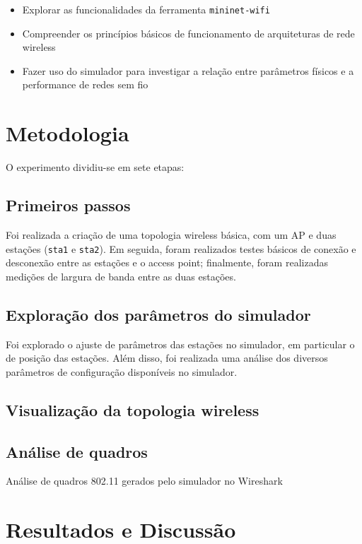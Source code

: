 \documentclass{article}
\begin{document}
\begin{itemize}
    \item Explorar as funcionalidades da ferramenta \texttt{mininet-wifi}
    \item Compreender os princípios básicos de funcionamento de arquiteturas
          de rede wireless
    \item Fazer uso do simulador para investigar a relação entre parâmetros
          físicos e a performance de redes sem fio
\end{itemize}

\section{Metodologia}

O experimento dividiu-se em sete etapas:

\subsection{Primeiros passos}

Foi realizada a criação de uma topologia wireless básica, com um AP e duas estações
(\texttt{sta1} e \texttt{sta2}).
Em seguida, foram realizados testes básicos de conexão e desconexão entre as estações
e o access point; finalmente, foram realizadas medições de largura de banda entre as
duas estações.

\subsection{Exploração dos parâmetros do simulador}
Foi explorado o ajuste de parâmetros das estações no simulador, em particular o de
posição das estações. Além disso, foi realizada uma análise dos diversos parâmetros
de configuração disponíveis no simulador.


\subsection{Visualização da topologia wireless}




\subsection{Análise de quadros}
Análise de quadros 802.11 gerados pelo simulador no Wireshark


\section{Resultados e Discussão}
\end{document}
